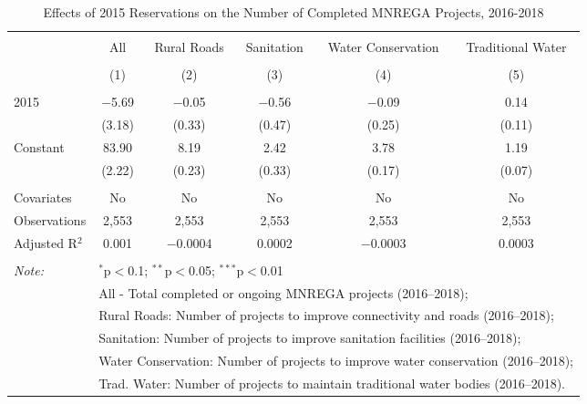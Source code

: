 
\begin{table}[!htbp] \centering 
  \caption{Effects of 2015 Reservations on the Number of Completed MNREGA Projects, 2016-2018} 
  \label{main_mnrega_15} 
\scriptsize 
\begin{tabular}{@{\extracolsep{1pt}}lccccc} 
\\[-1.8ex]\hline 
\hline \\[-1.8ex] 
 & All & Rural Roads & Sanitation & Water Conservation & Traditional Water \\ 
\\[-1.8ex] & (1) & (2) & (3) & (4) & (5)\\ 
\hline \\[-1.8ex] 
 2015 & $-$5.69 & $-$0.05 & $-$0.56 & $-$0.09 & 0.14 \\ 
  & (3.18) & (0.33) & (0.47) & (0.25) & (0.11) \\ 
  Constant & 83.90 & 8.19 & 2.42 & 3.78 & 1.19 \\ 
  & (2.22) & (0.23) & (0.33) & (0.17) & (0.07) \\ 
 \hline \\[-1.8ex] 
Covariates & No & No & No & No & No \\ 
Observations & 2,553 & 2,553 & 2,553 & 2,553 & 2,553 \\ 
Adjusted R$^{2}$ & 0.001 & $-$0.0004 & 0.0002 & $-$0.0003 & 0.0003 \\ 
\hline 
\hline \\[-1.8ex] 
\textit{Note:}  & \multicolumn{5}{l}{$^{*}$p$<$0.1; $^{**}$p$<$0.05; $^{***}$p$<$0.01} \\ 
 & \multicolumn{5}{l}{All - Total completed or ongoing MNREGA projects (2016--2018);} \\ 
 & \multicolumn{5}{l}{Rural Roads: Number of projects to improve connectivity and roads (2016--2018);} \\ 
 & \multicolumn{5}{l}{Sanitation:  Number of projects to improve sanitation facilities  (2016--2018);} \\ 
 & \multicolumn{5}{l}{Water Conservation: Number of projects to improve water conservation (2016--2018);} \\ 
 & \multicolumn{5}{l}{Trad. Water: Number of projects to maintain traditional water bodies (2016--2018).} \\ 
\end{tabular} 
\end{table} 
